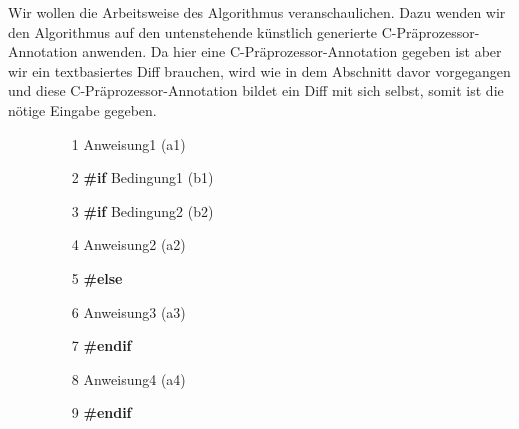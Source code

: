 Wir wollen die Arbeitsweise des Algorithmus veranschaulichen. Dazu wenden wir den Algorithmus auf den untenstehende künstlich generierte C-Präprozessor-Annotation anwenden. Da hier eine C-Präprozessor-Annotation gegeben ist aber wir ein textbasiertes Diff brauchen, wird wie in dem Abschnitt davor vorgegangen und diese C-Präprozessor-Annotation bildet ein Diff mit sich selbst, somit ist die nötige Eingabe gegeben.
\begin{figure}[h]
\begin{itemize}
	\item[1 ] Anweisung1	(a1)
	\item[2 ] \textbf{\#if} Bedingung1 (b1)
	\item[3 ] \hspace*{0.5cm} \textbf{\#if} Bedingung2 (b2)
	\item[4 ] \hspace*{1cm}Anweisung2 (a2)
	\item[5 ] \hspace*{0.5cm}\textbf{\#else}
	\item[6 ] \hspace*{1cm}Anweisung3 (a3)
	\item[7 ] \hspace*{0.5cm}\textbf{\#endif}
	\item[8 ] \hspace*{0.5cm}Anweisung4 (a4)
	\item[9 ] \textbf{\#endif}
\end{itemize}
\end{figure}
